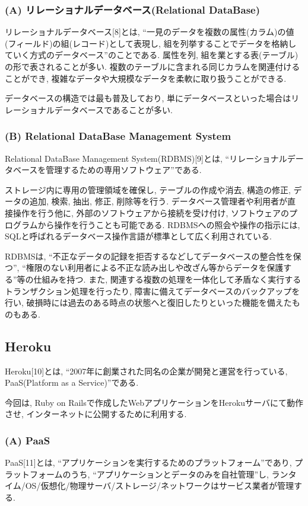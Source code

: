 \subsubsection{(A) リレーショナルデータベース(Relational DataBase)}
リレーショナルデータベース[8]とは, “一見のデータを複数の属性(カラム)の値(フィールド)の組(レコード)として表現し, 組を列挙することでデータを格納していく方式のデータベース”のことである.
属性を列, 組を業とする表(テーブル)の形で表されることが多い.
複数のテーブルに含まれる同じカラムを関連付けることができ, 複雑なデータや大規模なデータを柔軟に取り扱うことができる.

データベースの構造では最も普及しており, 単にデータベースといった場合はリレーショナルデータベースであることが多い.

\subsubsection{(B) Relational DataBase Management System}
Relational DataBase Management System(RDBMS)[9]とは, “リレーショナルデータベースを管理するための専用ソフトウェア”である.

ストレージ内に専用の管理領域を確保し, テーブルの作成や消去, 構造の修正, データの追加, 検索, 抽出, 修正, 削除等を行う.
データベース管理者や利用者が直接操作を行う他に, 外部のソフトウェアから接続を受け付け, ソフトウェアのプログラムから操作を行うことも可能である.
RDBMSへの照会や操作の指示には, SQLと呼ばれるデータベース操作言語が標準として広く利用されている.

RDBMSは, “不正なデータの記録を拒否するなどしてデータベースの整合性を保つ”, “権限のない利用者による不正な読み出しや改ざん等からデータを保護する”等の仕組みを持つ.
また, 関連する複数の処理を一体化して矛盾なく実行するトランザクション処理を行ったり, 障害に備えてデータベースのバックアップを行い, 破損時には過去のある時点の状態へと復旧したりといった機能を備えたものもある.

\subsection{Heroku}
Heroku[10]とは, “2007年に創業された同名の企業が開発と運営を行っている, PaaS(Platform as a Service)”である.

今回は, Ruby on Railsで作成したWebアプリケーションをHerokuサーバにて動作させ, インターネットに公開するために利用する.

\subsubsection{(A) PaaS}
PaaS[11]とは, “アプリケーションを実行するためのプラットフォーム”であり, プラットフォームのうち, “アプリケーションとデータのみを自社管理”し, ランタイム/OS/仮想化/物理サーバ/ストレージ/ネットワークはサービス業者が管理する.

